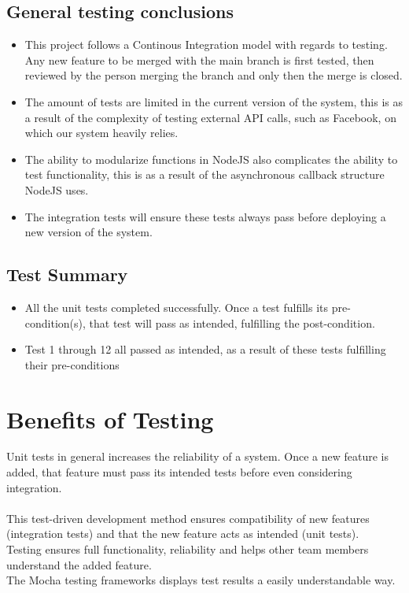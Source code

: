 \documentclass{article}
\begin{document}
\subsection{General testing conclusions}
\begin{itemize}
\item This project follows a Continous Integration model with regards to testing. Any new feature to be merged with the main branch is first tested, then reviewed by the person merging the branch and only then the merge is closed.

\item  The amount of tests are limited in the current version of the system, this is as a result of the complexity of testing external API calls, such as Facebook, on which our system heavily relies.


\item The ability to modularize functions in NodeJS also complicates the ability to test functionality, this is as a result of the asynchronous callback structure NodeJS uses. 
\item The integration tests will ensure these tests always pass before deploying a new version of the system.
\end{itemize}

\subsection{Test Summary}
\begin{itemize} 
\item All the unit tests completed successfully. Once a test fulfills its pre-condition(s), that test will pass as intended, fulfilling the post-condition. 
\item Test 1 through 12 all passed as intended, as a result of these tests fulfilling their pre-conditions
\end{itemize}
\section{Benefits of Testing}
Unit tests in general increases the reliability of a system. Once a new feature is added, that feature must pass its intended tests before even considering integration.\\ \\ This test-driven development method ensures compatibility of new features (integration tests) and that the new feature acts as intended (unit tests). \\
Testing ensures full functionality, reliability and helps other team members understand the added feature. \\ 
The Mocha testing frameworks displays test results a easily understandable way.
\end{document}
